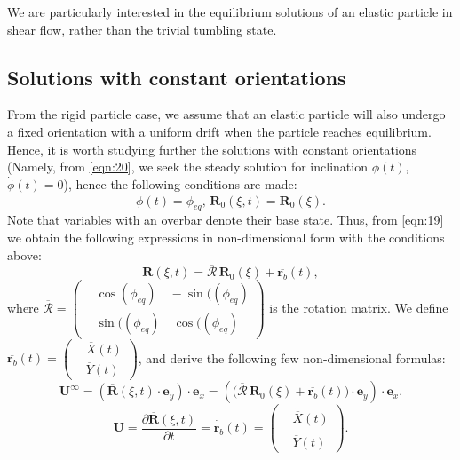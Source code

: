 \documentclass[a4paper,12pt]{report}
\begin{document}
We are particularly interested in the equilibrium solutions of an elastic particle in shear flow, rather than the trivial tumbling state. 

\subsection{Solutions with constant orientations}
From the rigid particle case, we assume that an elastic particle will also undergo a fixed orientation with a uniform drift when the particle reaches equilibrium. Hence, it is worth studying further the solutions with constant orientations (Namely, from \eqref{eqn:20}, we seek the steady solution for inclination $\phi(t)$, $\dot{\phi}(t)=0$), hence the following conditions are made:
\begin{equation}
	\label{eqn:39}
	\overline{\phi}(t)=\phi_{eq},\, \overline{\mathbf{R}_0}(\xi,t)=\mathbf{R}_0(\xi).
\end{equation}
Note that variables with an overbar denote their base state. Thus, from \eqref{eqn:19} we obtain the following expressions in non-dimensional form with the conditions above:
\begin{equation}
	\label{eqn:40}
	\overline{\mathbf{R}}(\xi,t)=\overline{\mathbf{\mathcal{R}}}\,\mathbf{R}_0(\xi)+\overline{\mathbf{r}_b}(t),
\end{equation}
where $\overline{\mathbf{\mathcal{R}}}=\left(\begin{aligned}
	&\cos(\phi_{eq})\quad -\sin((\phi_{eq}) \\
	&\sin((\phi_{eq})\quad \cos((\phi_{eq})
\end{aligned}\right) $ is the rotation matrix. We define $\overline{\mathbf{r}_b}(t)=\left(\begin{aligned}
	&\overline{X}(t) \\
	&\overline{Y}(t)
\end{aligned}\right)$, and derive the following few non-dimensional formulas:
\begin{equation}
	\label{eqn:41}
	\mathbf{U}^{\infty}=\left(\overline{\mathbf{R}}(\xi,t)\cdot\mathbf{e}_y\right)\cdot\mathbf{e}_x=\left(\Big(\overline{\mathbf{\mathcal{R}}}\,\mathbf{R}_0(\xi)+\overline{\mathbf{r}_b}(t)\Big)\cdot\mathbf{e}_y\right)\cdot\mathbf{e}_x.
\end{equation}
\begin{equation}
	\label{eqn:42}
	\mathbf{U}=\frac{\partial\overline{\mathbf{R}}(\xi,t)}{\partial t}=\dot{\overline{\mathbf{r}_b}}(t)=\left(\begin{aligned}
		&\dot{\overline{X}}(t) \\
		&\dot{\overline{Y}}(t)
	\end{aligned}\right).
\end{equation}
\end{document}
